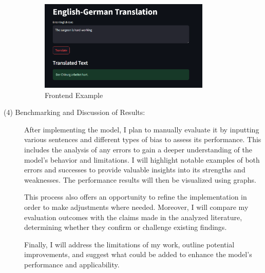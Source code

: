 \begin{description}
\begin{figure}[htbp]
    \centering
    \includegraphics[width=0.8\textwidth]{images/Screenshot_Frontend.png}
    \caption{Frontend Example}
    \label{fig:demo_image}
\end{figure}

\item[(4) Benchmarking and Discussion of Results:] 

After implementing the model, I plan to manually evaluate it by inputting various sentences and different types of bias to assess its performance. This includes the analysis of any errors to gain a deeper understanding of the model's behavior and limitations. I will highlight notable examples of both errors and successes to provide valuable insights into its strengths and weaknesses. The performance results will then be visualized using graphs. 

This process also offers an opportunity to refine the implementation in order to make adjustments where needed. Moreover, I will compare my evaluation outcomes with the claims made in the analyzed literature, determining whether they confirm or challenge existing findings.

Finally, I will address the limitations of my work, outline potential improvements, and suggest what could be added to enhance the model's performance and applicability.


\end{description}


